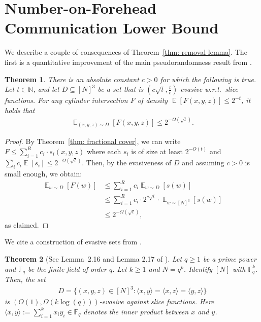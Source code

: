 \documentclass[11pt]{article}
\newtheorem{theorem}{Theorem}[section]
\DeclareMathOperator*{\E}{\mathbb{E}}
\newcommand{\1}{ \mathbbm{1}}
\begin{document}
\section{Number-on-Forehead Communication Lower Bound}

 We describe a couple of consequences of Theorem~\ref{thm: removal lemma}. The first is a quantitative improvement of the main pseudorandomness result from \cite{KelleyLM2024-nof}.

\begin{theorem}\label{thm: pseudorandom for CI from cubes}
There is an absolute constant $c > 0$ for which the following is true. Let $t\in \mathbb{N}$, and let $D\subseteq [N]^3$ be a set that is $(c\sqrt{t},\frac{t}{c})$-evasive w.r.t.~slice functions. For any cylinder intersection $F$ of density $\E[F(x,y,z)] \le 2^{-t}$, it holds that
\begin{align*}
\E_{(x,y,z)\sim D}[F(x,y,z)] \le 2^{-\Omega(\sqrt{t})}.
\end{align*}
\end{theorem}

\begin{proof}
    By Theorem~\ref{thm: fractional cover}, we can write $F \le \sum_{i=1}^{R} c_i \cdot s_i(x,y,z)$ where each $s_i$ is of size at least $2^{-O(t)}$ and $\sum_i c_i \E[s_i] \le 2^{-\Omega(\sqrt{t})}$. Then, by the evasiveness of $D$ and assuming $c > 0$ is small enough, we obtain:
    \begin{align*}
        \E_{w\sim D}[F(w)] 
        &\le \sum_{i=1}^{R} c_i \E_{w\sim D}[s(w)] \\
        &\le \sum_{i=1}^{R} c_i \cdot 2^{c\sqrt{t}} \cdot \E_{w\sim [N]^3}[s(w)] \\
        &\le 2^{-\Omega(\sqrt{t})},
    \end{align*}
    as claimed.
\end{proof}

We cite a construction of evasive sets from \cite{KelleyLM2024-nof}.

\begin{theorem}[See Lemma~2.16 and Lemma 2.17 of \cite{KelleyLM2024-nof}]\label{thm: construction of pseudorandom sets}
Let $q\ge 1$ be a prime power and $\mathbb{F}_q$ be the finite field of order $q$. Let $k\ge 1$ and $N = q^k$. Identify $[N]$ with $\mathbb{F}_q^k$. Then, the set
\begin{align*}
    D = \{ (x,y,z) \in [N]^3: \langle x,y\rangle = \langle x,z\rangle = \langle y, z\rangle \}
\end{align*}
is $(O(1), \Omega(k\log(q)))$-evasive against slice functions. Here $\langle x,y\rangle := \sum_{i=1}^{k}x_i y_i \in \mathbb{F}_q$ denotes the inner product between $x$ and $y$.
\end{theorem}
\end{document}
